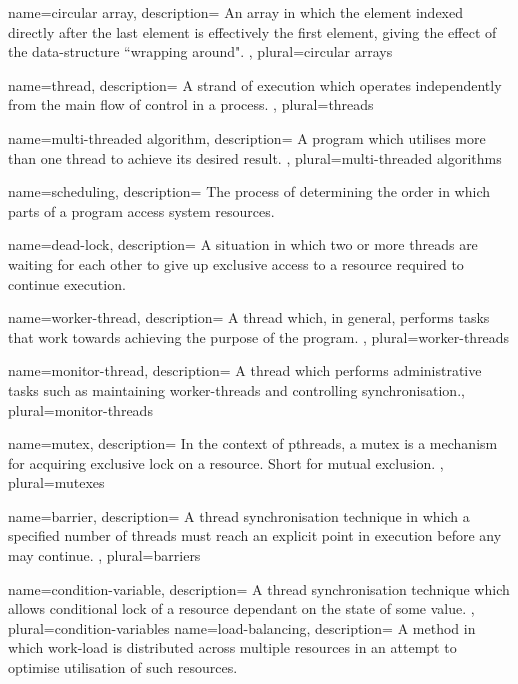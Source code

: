 {
    name={circular array},
    description={
        An array in which the element indexed directly after the last element 
        is effectively the first element, giving the effect of the 
        data-structure ``wrapping around".
    },
    plural={circular arrays}
}

{
    name={thread},
    description={
        A strand of execution which operates independently from the main flow of
        control in a process.
    },
    plural={threads}
}

{
    name={multi-threaded algorithm},
    description={
        A program which utilises more than one thread to achieve its desired 
        result.
    },
    plural={multi-threaded algorithms}
}

{
    name={scheduling},
    description={
        The process of determining the order in which parts of a program access
        system resources.
    }
}

{
    name={dead-lock},
    description={
        A situation in which two or more threads are waiting for each other to 
        give up exclusive access to a resource required to continue execution.
    }
}

{
    name={worker-thread},
    description={
        A thread which, in general, performs tasks that work towards achieving 
        the purpose of the program.
    },
    plural={worker-threads}
}

{
    name={monitor-thread},
    description={
        A thread which performs administrative tasks such as maintaining worker-threads
        and controlling synchronisation.},
    plural={monitor-threads}
}

{
    name={mutex},
    description={
        In the context of pthreads, a mutex is a mechanism
        for acquiring exclusive lock on a resource. Short for mutual exclusion.
    },
    plural={mutexes}
}

{
    name={barrier},
    description={
        A thread synchronisation technique in which a specified number of threads 
        must reach an explicit point in execution before any may continue.    
    },
    plural={barriers}
}

{
    name={condition-variable},
    description={
        A thread synchronisation technique which allows conditional lock of a resource dependant
        on the state of some value.
    },
    plural={condition-variables}
}
{
    name={load-balancing},
    description={
        A method in which work-load is distributed across multiple resources in an 
        attempt to optimise utilisation of such resources.
    }
}

